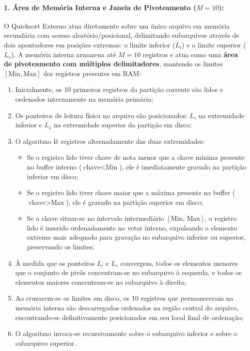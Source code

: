 \documentclass[12pt,a4paper]{article}
\begin{document}
\paragraph{1. Área de Memória Interna e Janela de Pivoteamento ($M = 10$):}
O Quicksort Externo atua diretamente sobre um único arquivo em memória secundária com acesso aleatório/posicional, delimitando subarquivos através de dois apontadores em posições extremas: o limite inferior ($L_i$) e o limite superior ($L_s$). A memória interna armazena até $M = 10$ registros e atua como uma \textbf{área de pivoteamento com múltiplos delimitadores}, mantendo os limites $[\text{Min}, \text{Max}]$ dos registros presentes em RAM:
\begin{enumerate}
    \item Inicialmente, os 10 primeiros registros da partição corrente são lidos e ordenados internamente na memória primária;
    \item Os ponteiros de leitura física no arquivo são posicionados: $L_i$ na extremidade inferior e $L_s$ na extremidade superior da partição em disco;
    \item O algoritmo lê registros alternadamente das duas extremidades:
    \begin{itemize}
        \item Se o registro lido tiver chave de nota menor que a chave mínima presente no buffer interno ($\text{chave} < \text{Min}$), ele é imediatamente gravado na partição inferior em disco;
        \item Se o registro lido tiver chave maior que a máxima presente no buffer ($\text{chave} > \text{Max}$), ele é gravado na partição superior em disco;
        \item Se a chave situar-se no intervalo intermediário $[\text{Min}, \, \text{Max}]$, o registro lido é inserido ordenadamente no vetor interno, expulsando o elemento extremo mais adequado para gravação no subarquivo inferior ou superior, preservando os limites;
    \end{itemize}
    \item À medida que os ponteiros $L_i$ e $L_s$ convergem, todos os elementos menores que o conjunto de pivôs concentram-se no subarquivo à esquerda, e todos os elementos maiores concentram-se no subarquivo à direita;
    \item Ao cruzarem-se os limites em disco, os 10 registros que permaneceram na memória interna são descarregados ordenados na região central do arquivo, encontrando-se definitivamente posicionados em seu local final de ordenação;
    \item O algoritmo invoca-se recursivamente sobre o subarquivo inferior e sobre o subarquivo superior.
\end{enumerate}
\end{document}
